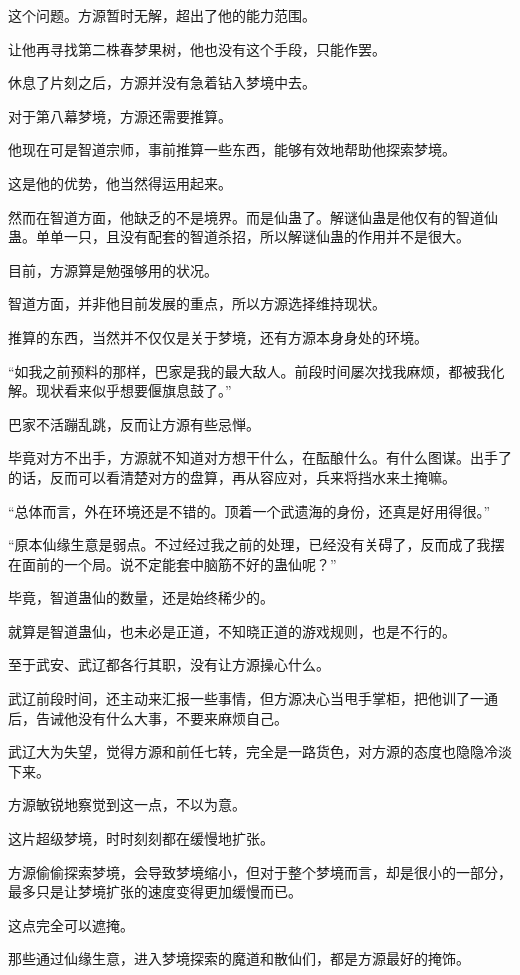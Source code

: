 \begin{this_body}
这个问题。方源暂时无解，超出了他的能力范围。

让他再寻找第二株春梦果树，他也没有这个手段，只能作罢。

休息了片刻之后，方源并没有急着钻入梦境中去。

对于第八幕梦境，方源还需要推算。

他现在可是智道宗师，事前推算一些东西，能够有效地帮助他探索梦境。

这是他的优势，他当然得运用起来。

然而在智道方面，他缺乏的不是境界。而是仙蛊了。解谜仙蛊是他仅有的智道仙蛊。单单一只，且没有配套的智道杀招，所以解谜仙蛊的作用并不是很大。

目前，方源算是勉强够用的状况。

智道方面，并非他目前发展的重点，所以方源选择维持现状。

推算的东西，当然并不仅仅是关于梦境，还有方源本身身处的环境。

“如我之前预料的那样，巴家是我的最大敌人。前段时间屡次找我麻烦，都被我化解。现状看来似乎想要偃旗息鼓了。”

巴家不活蹦乱跳，反而让方源有些忌惮。

毕竟对方不出手，方源就不知道对方想干什么，在酝酿什么。有什么图谋。出手了的话，反而可以看清楚对方的盘算，再从容应对，兵来将挡水来土掩嘛。

“总体而言，外在环境还是不错的。顶着一个武遗海的身份，还真是好用得很。”

“原本仙缘生意是弱点。不过经过我之前的处理，已经没有关碍了，反而成了我摆在面前的一个局。说不定能套中脑筋不好的蛊仙呢？”

毕竟，智道蛊仙的数量，还是始终稀少的。

就算是智道蛊仙，也未必是正道，不知晓正道的游戏规则，也是不行的。

至于武安、武辽都各行其职，没有让方源操心什么。

武辽前段时间，还主动来汇报一些事情，但方源决心当甩手掌柜，把他训了一通后，告诫他没有什么大事，不要来麻烦自己。

武辽大为失望，觉得方源和前任七转，完全是一路货色，对方源的态度也隐隐冷淡下来。

方源敏锐地察觉到这一点，不以为意。

这片超级梦境，时时刻刻都在缓慢地扩张。

方源偷偷探索梦境，会导致梦境缩小，但对于整个梦境而言，却是很小的一部分，最多只是让梦境扩张的速度变得更加缓慢而已。

这点完全可以遮掩。

那些通过仙缘生意，进入梦境探索的魔道和散仙们，都是方源最好的掩饰。


\end{this_body}
